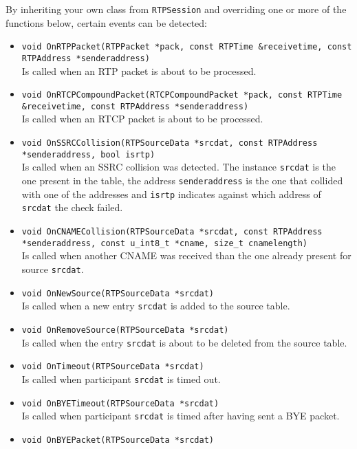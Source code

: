 \documentclass[12pt,a4paper]{article}
\begin{document}
				By inheriting your own class from {\tt RTPSession} and overriding
				one or more of the functions below, certain events can be detected:
				\begin{itemize}
					\item {\tt void OnRTPPacket(RTPPacket *pack, const RTPTime \&receivetime,
					                                    const RTPAddress *senderaddress)}\\
						Is called when an RTP packet is about to be processed.
					\item {\tt void OnRTCPCompoundPacket(RTCPCompoundPacket *pack, const RTPTime \&receivetime,
					                                             const RTPAddress *senderaddress)}\\
						Is called when an RTCP packet is about to be processed.
					\item {\tt void OnSSRCCollision(RTPSourceData *srcdat, const RTPAddress *senderaddress, bool isrtp)}\\
						Is called when an SSRC collision was detected. The instance
						{\tt srcdat} is the one present in the table, the address
						{\tt senderaddress} is the one that collided with one of the
						addresses and {\tt isrtp} indicates against which address of
						{\tt srcdat} the check failed.
					\item {\tt void OnCNAMECollision(RTPSourceData *srcdat, const RTPAddress *senderaddress,
					                                         const u\_int8\_t *cname, size\_t cnamelength)}\\
						Is called when another CNAME was received than the one
						already present for source {\tt srcdat}.
					\item {\tt void OnNewSource(RTPSourceData *srcdat)}\\
						Is called when a new entry {\tt srcdat} is added to the source
						table.
					\item {\tt void OnRemoveSource(RTPSourceData *srcdat)}\\
						Is called when the entry {\tt srcdat} is about to be
						deleted from the source table.
					\item {\tt void OnTimeout(RTPSourceData *srcdat)}\\
						Is called when participant {\tt srcdat} is timed out.
					\item {\tt void OnBYETimeout(RTPSourceData *srcdat)}\\
						Is called when participant {\tt srcdat} is timed after
						having sent a BYE packet.
					\item {\tt void OnBYEPacket(RTPSourceData *srcdat)}\\

\end{itemize}
\end{document}
